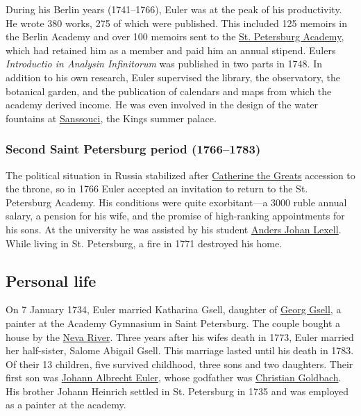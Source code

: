 During his Berlin years (1741--1766), Euler was at the peak of his productivity. He wrote 380 works, 275 of which were published. This included 125 memoirs in the Berlin Academy and over 100 memoirs sent to the \href{https://en.wikipedia.org/wiki/Russian_Academy_of_Sciences}{St. Petersburg Academy}, which had retained him as a member and paid him an annual stipend. Euler\textquotesingle s \emph{Introductio in Analysin Infinitorum} was published in two parts in 1748. In addition to his own research, Euler supervised the library, the observatory, the botanical garden, and the publication of calendars and maps from which the academy derived income. He was even involved in the design of the water fountains at \href{https://en.wikipedia.org/wiki/Sanssouci}{Sanssouci}, the King\textquotesingle s summer palace.


\subsubsection[Second Saint Petersburg period (1766--1783)]{\texorpdfstring{\protect\hypertarget{Second_Saint_Petersburg_period_.281766.E2.80.931783.29}{}{}Second Saint Petersburg period (1766--1783)}{Second Saint Petersburg period (1766--1783)}}\label{Second_Saint_Petersburg_period_ux281766ux20131783ux29}

The political situation in Russia stabilized after \href{https://en.wikipedia.org/wiki/Catherine_the_Great}{Catherine the Great\textquotesingle s} accession to the throne, so in 1766 Euler accepted an invitation to return to the St. Petersburg Academy. His conditions were quite exorbitant---a 3000 ruble annual salary, a pension for his wife, and the promise of high-ranking appointments for his sons. At the university he was assisted by his student \href{https://en.wikipedia.org/wiki/Anders_Johan_Lexell}{Anders Johan Lexell}. While living in St. Petersburg, a fire in 1771 destroyed his home.


\subsection{Personal life}\label{Personal_life}

On 7 January 1734, Euler married Katharina Gsell, daughter of \href{https://en.wikipedia.org/wiki/Georg_Gsell}{Georg Gsell}, a painter at the Academy Gymnasium in Saint Petersburg. The couple bought a house by the \href{https://en.wikipedia.org/wiki/Neva_River}{Neva River}. Three years after his wife\textquotesingle s death in 1773, Euler married her half-sister, Salome Abigail Gsell. This marriage lasted until his death in 1783. Of their 13 children, five survived childhood, three sons and two daughters. Their first son was \href{https://en.wikipedia.org/wiki/Johann_Euler}{Johann Albrecht Euler}, whose godfather was \href{https://en.wikipedia.org/wiki/Christian_Goldbach}{Christian Goldbach}. His brother Johann Heinrich settled in St. Petersburg in 1735 and was employed as a painter at the academy.

